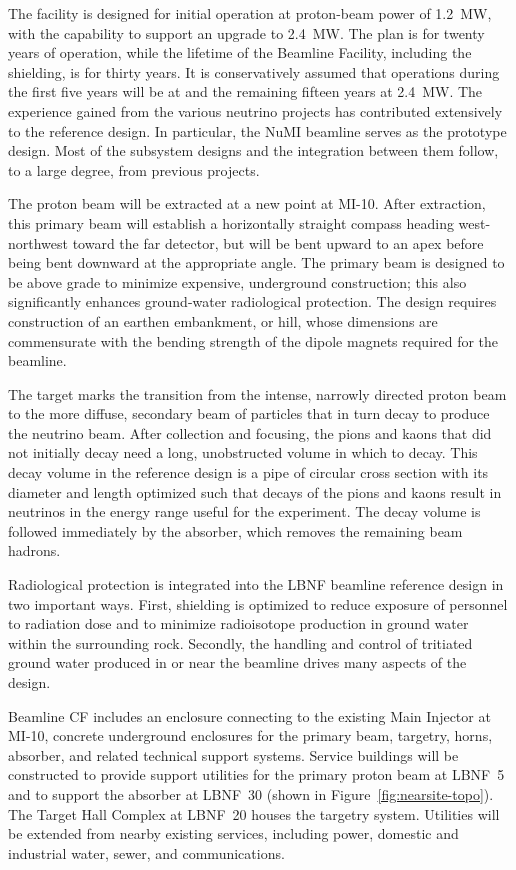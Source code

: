 The facility is designed for initial operation at proton-beam power of \SI{1.2}{\MW}, with the capability to support an upgrade to \SI{2.4}{\MW}. The plan is for twenty years of operation, while the lifetime of the Beamline Facility, including the shielding, is for thirty years. It is conservatively assumed that operations during the first five years will be at  and the remaining fifteen years at \SI{2.4}{\MW}.  
The experience gained from the various neutrino projects has contributed extensively to the reference design. In particular, the NuMI beamline serves as the prototype design. Most of the subsystem designs and the integration between them follow, to a large degree, from previous projects. 
 
The proton beam will be extracted at a new point at MI-10. After extraction, this primary beam will establish a horizontally straight compass heading west-northwest toward the far detector, but will be bent upward to an apex before being bent downward at the appropriate angle. The primary beam is designed to be above grade to minimize expensive, underground construction; this also significantly enhances ground-water radiological protection. The design requires construction of an earthen embankment, or hill, whose dimensions are commensurate with the bending strength of the dipole magnets required for the beamline. 
 
The target marks the transition from the intense, narrowly directed proton beam to the more diffuse, secondary beam of particles that in turn decay to produce the neutrino beam. After collection and focusing, the pions and kaons that did not initially decay need a long, unobstructed volume in which to decay. This decay volume in the reference design is a pipe of circular cross section with its diameter and length optimized such that decays of the pions and kaons result in neutrinos in the energy range useful for the experiment. The decay volume is followed immediately by the absorber, which removes the remaining beam hadrons. 
 
Radiological protection is integrated into the LBNF beamline reference design in two important ways. First, shielding is optimized to reduce exposure of personnel to radiation dose and to minimize radioisotope production in ground water within the surrounding rock. Secondly, the handling and control of tritiated ground water produced in or near the beamline drives many aspects of the design. 
 
Beamline CF includes an enclosure connecting to the existing Main Injector at MI-10, concrete underground enclosures for the primary beam, targetry, horns, absorber, and related technical support systems. Service buildings will be constructed to provide support utilities for the primary proton beam at LBNF~5 and to support the absorber at LBNF~30 (shown in Figure~\ref{fig:nearsite-topo}).  The Target Hall Complex at LBNF~20 houses the targetry system.  Utilities will be extended from nearby existing services, including power, domestic and industrial water, sewer, and communications. 
 

